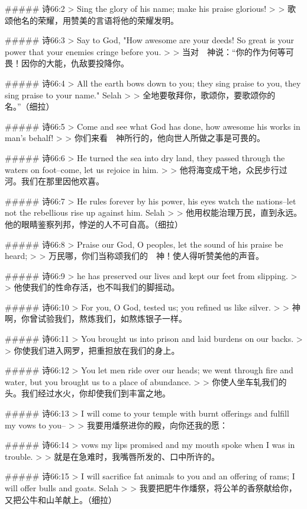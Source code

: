 ##### 诗66:2
> Sing the glory of his name; make his praise glorious!
>
> 歌颂他名的荣耀，用赞美的言语将他的荣耀发明。


##### 诗66:3
> Say to God, "How awesome are your deeds! So great is your power that your enemies cringe before you.
>
> 当对　神说：“你的作为何等可畏！因你的大能，仇敌要投降你。


##### 诗66:4
> All the earth bows down to you; they sing praise to you, they sing praise to your name." Selah
>
> 全地要敬拜你，歌颂你，要歌颂你的名。”（细拉）


##### 诗66:5
> Come and see what God has done, how awesome his works in man's behalf!
>
> 你们来看　神所行的，他向世人所做之事是可畏的。


##### 诗66:6
> He turned the sea into dry land, they passed through the waters on foot--come, let us rejoice in him.
>
> 他将海变成干地，众民步行过河。我们在那里因他欢喜。


##### 诗66:7
> He rules forever by his power, his eyes watch the nations--let not the rebellious rise up against him. Selah
>
> 他用权能治理万民，直到永远。他的眼睛鉴察列邦，悖逆的人不可自高。（细拉）


##### 诗66:8
> Praise our God, O peoples, let the sound of his praise be heard;
>
> 万民哪，你们当称颂我们的　神！使人得听赞美他的声音。


##### 诗66:9
> he has preserved our lives and kept our feet from slipping.
>
> 他使我们的性命存活，也不叫我们的脚摇动。


##### 诗66:10
> For you, O God, tested us; you refined us like silver.
>
> 神啊，你曾试验我们，熬炼我们，如熬炼银子一样。


##### 诗66:11
> You brought us into prison and laid burdens on our backs.
>
> 你使我们进入网罗，把重担放在我们的身上。


##### 诗66:12
> You let men ride over our heads; we went through fire and water, but you brought us to a place of abundance.
>
> 你使人坐车轧我们的头。我们经过水火，你却使我们到丰富之地。


##### 诗66:13
> I will come to your temple with burnt offerings and fulfill my vows to you--
>
> 我要用燔祭进你的殿，向你还我的愿：


##### 诗66:14
> vows my lips promised and my mouth spoke when I was in trouble.
>
> 就是在急难时，我嘴唇所发的、口中所许的。


##### 诗66:15
> I will sacrifice fat animals to you and an offering of rams; I will offer bulls and goats. Selah
>
> 我要把肥牛作燔祭，将公羊的香祭献给你，又把公牛和山羊献上。（细拉）



